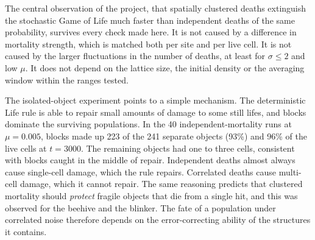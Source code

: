 \documentclass[11pt,a4paper]{article}
\begin{document}
The central observation of the project, that spatially clustered deaths extinguish the stochastic Game of Life much faster than independent deaths of the same probability, survives every check made here. It is not caused by a difference in mortality strength, which is matched both per site and per live cell. It is not caused by the larger fluctuations in the number of deaths, at least for $\sigma\le2$ and low $\mu$. It does not depend on the lattice size, the initial density or the averaging window within the ranges tested.

The isolated-object experiment points to a simple mechanism. The deterministic Life rule is able to repair small amounts of damage to some still lifes, and blocks dominate the surviving populations. In the 40 independent-mortality runs at $\mu=0.005$, blocks made up 223 of the 241 separate objects (93\%) and 96\% of the live cells at $t=3000$. The remaining objects had one to three cells, consistent with blocks caught in the middle of repair. Independent deaths almost always cause single-cell damage, which the rule repairs. Correlated deaths cause multi-cell damage, which it cannot repair. The same reasoning predicts that clustered mortality should \emph{protect} fragile objects that die from a single hit, and this was observed for the beehive and the blinker. The fate of a population under correlated noise therefore depends on the error-correcting ability of the structures it contains.
\end{document}
